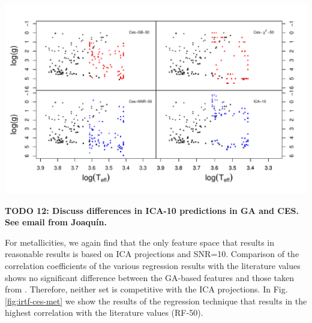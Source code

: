 
\begin {figure*}
 \centering
  \includegraphics[width=\textwidth]{figs/irtf-figs/irtf-Cesseti.pdf}
  \caption{$\log(T_{eff})$--$\log(g)$ diagrams produced by the CES-KNN
    (SNR=$\infty$) effective temperatures, and gravities derived with
    the CES-GB (SNR=50), CES-$\chi^2$ (SNR=50), CES-NNR (SNR=50), and $ICA-10$
    models (clockwise, starting from the top left plot).}
 \label{fig:irtf-ces}
\end {figure*}

{\bf TODO 12: Discuss differences in ICA-10 predictions in GA and
  CES. See email from Joaquín.}
 
For metallicities, we again find that the only feature space that
results in reasonable results is based on ICA projections and
SNR=10. Comparison of the correlation coefficients of the various
regression results with the literature values shows no significant
difference between the GA-based features and those taken from
\cite{cesetti}. Therefore, neither set is competitive with the ICA
projections. In Fig. \ref{fig:irtf-ces-met} we show the results of the
regression technique that results in the highest correlation with the
literature values (RF-50).

